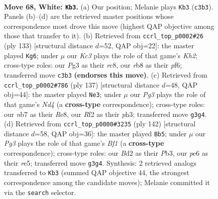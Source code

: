 \documentclass[11pt]{article}
\begin{document}
\clearpage

\begin{figure}[p]\centering
\begin{subfigure}{0.46\textwidth}\centering
\resizebox{\linewidth}{!}{%
\newchessgame
\chessboard[
  setfen={1r6/pn4kr/1p2p3/4P2p/2P5/2K3PR/P1NB1R2/8 w - - 7 68},
  showmover=false,
  pgfstyle=straightmove, color=movearrow, markmove={c3-b3}
]}
\caption{}
\end{subfigure}\hfill
\begin{subfigure}{0.46\textwidth}\centering
\resizebox{\linewidth}{!}{%
\newchessgame
\chessboard[
  setfen={2R5/2R2p1k/5P1p/1r1pp1p1/1P4P1/2K4P/r7/8 b - - 8 67},
  showmover=false,
  pgfstyle=straightmove, color=movearrow, markmove={h7-g6}
]}
\caption{}
\end{subfigure}
\\[4pt]
\begin{subfigure}{0.46\textwidth}\centering
\resizebox{\linewidth}{!}{%
\newchessgame
\chessboard[
  setfen={4r3/6r1/2k5/p1pn2P1/P2p4/7P/3N1R1K/6R1 b - - 0 69},
  showmover=false,
  pgfstyle=straightmove, color=movearrow, markmove={d5-e3}
]}
\caption{}
\end{subfigure}\hfill
\begin{subfigure}{0.46\textwidth}\centering
\resizebox{\linewidth}{!}{%
\newchessgame
\chessboard[
  setfen={R3n1k1/5p2/6pp/2prr3/7P/1P4P1/3p1P1K/3R1B2 w - - 0 72},
  showmover=false,
  pgfstyle=straightmove, color=movearrow, markmove={f1-b5}
]}
\caption{}
\end{subfigure}
\caption{\textbf{Move 68, White: \texttt{Kb3}.} (a) Our position; Melanie plays \texttt{Kb3} (\texttt{c3b3}). Panels (b)--(d) are the retrieved master positions whose correspondence most drove this move (highest QAP objective among those that transfer to it). (b) Retrieved from \texttt{ccrl\_top\_p0002\#26} (ply 133) [structural distance $d$=52, QAP obj=22]: the master played \texttt{Kg6}; under $\mu$ our \emph{Kc3} plays the role of that game's \emph{Kh2}; cross-type roles: our \emph{P}g3 as their \emph{r}c8, our \emph{r}b8 as their \emph{p}f6; transferred move \texttt{c3b3} \textbf{(endorses this move)}. (c) Retrieved from \texttt{ccrl\_top\_p0002\#786} (ply 137) [structural distance $d$=48, QAP obj=44]: the master played \texttt{Ne3}; under $\mu$ our \emph{Pg3} plays the role of that game's \emph{Nd4} (a \textbf{cross-type} correspondence); cross-type roles: our \emph{n}b7 as their \emph{R}e8, our \emph{R}f2 as their \emph{p}h3; transferred move \texttt{g3g4}. (d) Retrieved from \texttt{ccrl\_top\_p0000\#3235} (ply 142) [structural distance $d$=58, QAP obj=36]: the master played \texttt{Bb5}; under $\mu$ our \emph{Pg3} plays the role of that game's \emph{Bf1} (a \textbf{cross-type} correspondence); cross-type roles: our \emph{B}d2 as their \emph{P}b3, our \emph{p}e6 as their \emph{r}e5; transferred move \texttt{g3g4}. Synthesis: 2 retrieved analogs transferred to \texttt{Kb3} (summed QAP objective 44, the strongest correspondence among the candidate moves); Melanie committed it via the \texttt{search} selector.}
\label{fig:thought-m134}
\end{figure}
\end{document}
